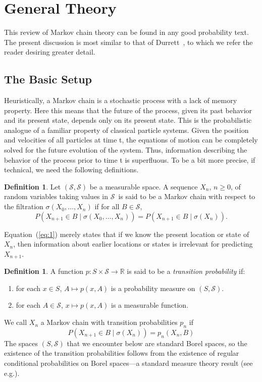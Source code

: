 \documentclass[12pt,letterpaper]{report}
\theoremstyle{plain}
\theoremstyle{definition}
\newtheorem{definition}[theorem]{Definition}
\theoremstyle{remark}
\numberwithin{theorem}{chapter}
\numberwithin{claim}{chapter}
\numberwithin{equation}{chapter}
\numberwithin{conjecture}{chapter}
\renewcommand\S{\ensuremath{\mathcal{S}}}
\newcommand\R{\ensuremath{\mathbb{R}}}
\newcommand\<{\ensuremath{\langle}}
\renewcommand\>{\ensuremath{\rangle}}
\begin{document}
\section{General Theory}
\label{sec:general-theory}
This review of Markov chain theory can be found in any good probability text. The present
discussion is most similar to that of Durrett~\cite{Durret:1996}, to which we
refer the reader desiring greater detail. 

\subsection{The Basic Setup}

Heuristically, a Markov chain is a stochastic process with a lack of memory property. Here
this means that the future of the process, given its past behavior and its present state, depends only
on its present state. This is the probabilistic analogue of a familiar property of classical particle
systems. Given the position and velocities of all particles at time t, the equations of motion can be
completely solved for the future evolution of the system. Thus, information describing the behavior
of the process prior to time t is superﬂuous. To be a bit more precise, if technical, we need the
following definitions.

\begin{definition}
Let $(\S, \S)$ be a measurable space. A sequence $X_n$, $n\geq 0$, of random variables
taking values in \S\ is said to be a Markov chain with respect to the filtration 
$\sigma(X_0, \dots, X_{n})$ if for all $B \in \S$,
\begin{equation}
\label{eq:1}
P(X_{n+1} \in B \mid \sigma(X_0, \dots, X_{n}))
=P(X_{n+1} \in B \mid \sigma(X_{n})).
\end{equation}
\end{definition}
Equation~(\ref{eq:1}) merely states that if we know the present location or state of $X_{n}$,
then information about earlier locations or states is irrelevant for predicting $X_{n+1}$.

\begin{definition}
A function $p : S \times \S \rightarrow \R$ is said to be a \emph{transition probability} if:
\begin{enumerate}
\item for each $x \in S$, $A \mapsto p(x, A)$ is a probability measure on $(S, \S)$.
\item for each $A \in \S$, $x \mapsto p(x, A)$ is a measurable function.
\end{enumerate}
\end{definition}
We call $X_n$ a Markov chain with transition probabilities $p_n$ if
\begin{equation}
\label{eq:2.2}
P(X_{n+1} \in B \mid  \sigma(X_n)) = p_n(X_n, B)
\end{equation}
The spaces $(S, \S)$ that we encounter below are standard Borel spaces, so the existence of the
transition probabilities follows from the existence of regular conditional
probabilities on Borel spaces---a standard measure theory result 
(see e.g.\cite{Durret:1996}). %
\end{document}
